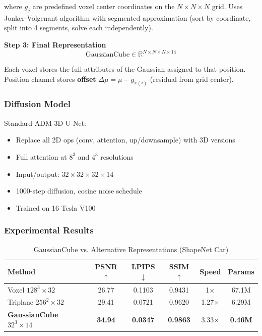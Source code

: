\documentclass[11pt, a4paper]{article}
\begin{document}
where $g_j$ are predefined voxel center coordinates on the $N \times N \times N$ grid. Uses Jonker-Volgenant algorithm with segmented approximation (sort by coordinate, split into 4 segments, solve each independently).

\textbf{Step 3: Final Representation}
\begin{equation}
    \boxed{\text{GaussianCube} \in \mathbb{R}^{N \times N \times N \times 14}}
\end{equation}

Each voxel stores the full attributes of the Gaussian assigned to that position. Position channel stores \textbf{offset} $\Delta\mu = \mu - g_{\pi(i)}$ (residual from grid center).

\subsubsection{Diffusion Model}

Standard ADM 3D U-Net:
\begin{itemize}
    \item Replace all 2D ops (conv, attention, up/downsample) with 3D versions
    \item Full attention at $8^3$ and $4^3$ resolutions
    \item Input/output: $32 \times 32 \times 32 \times 14$
    \item 1000-step diffusion, cosine noise schedule
    \item Trained on 16 Tesla V100
\end{itemize}

\subsubsection{Experimental Results}

\begin{table}[H]
\centering
\caption{GaussianCube vs. Alternative Representations (ShapeNet Car)}
\begin{tabular}{lccccc}
\toprule
Method & PSNR$\uparrow$ & LPIPS$\downarrow$ & SSIM$\uparrow$ & Speed & Params \\
\midrule
Voxel $128^3\times32$ & 26.77 & 0.1103 & 0.9431 & 1$\times$ & 67.1M \\
Triplane $256^2\times32$ & 29.41 & 0.0721 & 0.9620 & 1.27$\times$ & 6.29M \\
\textbf{GaussianCube} $32^3\times14$ & \textbf{34.94} & \textbf{0.0347} & \textbf{0.9863} & 3.33$\times$ & \textbf{0.46M} \\
\bottomrule
\end{tabular}
\end{table}
\end{document}
